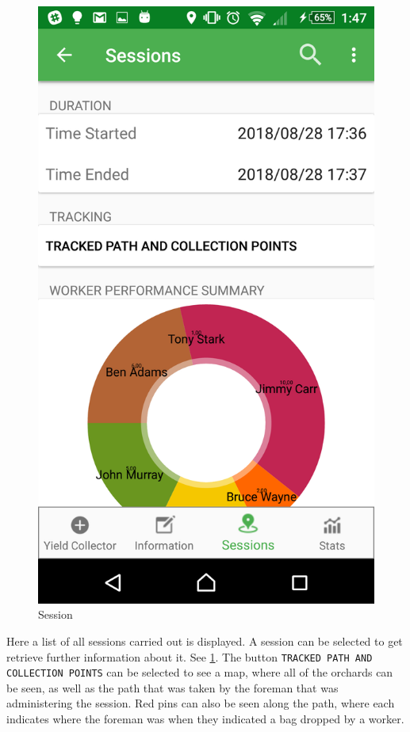 \documentclass[11pt]{article}
\begin{document}
\begin{figure}
 \centering
 \includegraphics[width=12cm, keepaspectratio]{Images/mobileSession.png}
 \caption{Session}
 \label{Mobile Session}
\end{figure}

Here a list of all sessions carried out is displayed. A session can be selected to get retrieve further information about it. See \ref{Mobile Session}. The button \texttt{TRACKED PATH AND COLLECTION POINTS} can be selected to see a map, where all of the orchards can be seen, as well as the path that was taken by the foreman that was administering the session. Red pins can also be seen along the path, where each indicates where the foreman was when they indicated a bag dropped by a worker.
\end{document}
